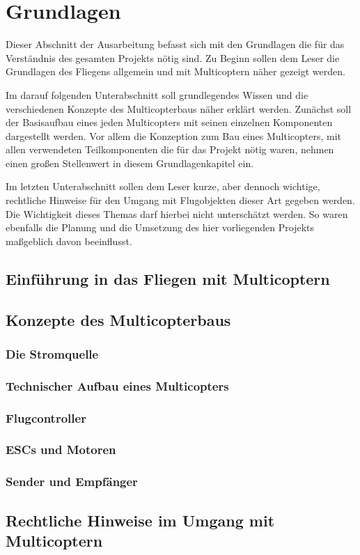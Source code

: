\section{Grundlagen}
Dieser Abschnitt der Ausarbeitung befasst sich mit den Grundlagen die für das Verständnis des gesamten Projekts nötig sind. Zu Beginn sollen dem Leser die Grundlagen des Fliegens allgemein und mit Multicoptern näher gezeigt werden.

Im darauf folgenden Unterabschnitt soll grundlegendes Wissen und die verschiedenen Konzepte des Multicopterbaus näher erklärt werden. Zunächst soll der Basisaufbau eines jeden Multicopters mit seinen einzelnen Komponenten dargestellt werden. Vor allem die Konzeption zum Bau eines Multicopters, mit allen verwendeten Teilkomponenten die für das Projekt nötig waren, nehmen einen großen Stellenwert in diesem Grundlagenkapitel ein.

Im letzten Unterabschnitt sollen dem Leser kurze, aber dennoch wichtige, rechtliche Hinweise für den Umgang mit Flugobjekten dieser Art gegeben werden. Die Wichtigkeit dieses Themas darf hierbei nicht unterschätzt werden. So waren ebenfalls die Planung und die Umsetzung des hier vorliegenden Projekts maßgeblich davon beeinflusst.

\subsection{Einführung in das Fliegen mit Multicoptern}



\subsection{Konzepte des Multicopterbaus}



\subsubsection{Die Stromquelle}



\subsubsection{Technischer Aufbau eines Multicopters}



\subsubsection{Flugcontroller}



\subsubsection{ESCs und Motoren}



\subsubsection{Sender und Empfänger}



\subsection{Rechtliche Hinweise im Umgang mit Multicoptern}
